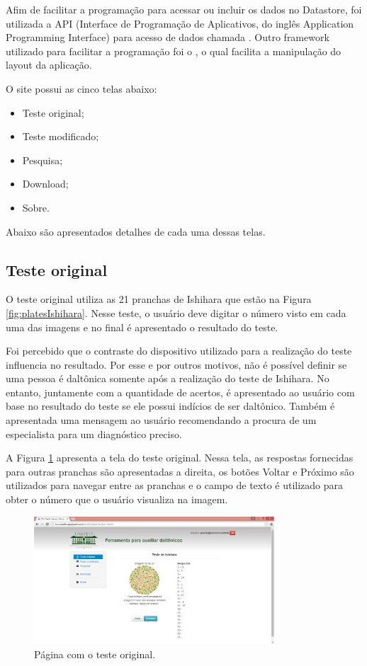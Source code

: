 \documentclass[	12pt, Times, openright, twoside, a4paper, english, brazil]{abntex2}
\begin{document}
Afim de facilitar a programação para acessar ou incluir os dados no Datastore, foi utilizada a API (Interface de Programação de Aplicativos, do inglês Application Programming Interface) para acesso de dados chamada . Outro framework utilizado para facilitar a programação foi o , o qual facilita a manipulação do layout da aplicação.

O site possui as cinco telas abaixo:

\begin{itemize}
\item Teste original;
\item Teste modificado;
\item Pesquisa;
\item Download;
\item Sobre.
\end{itemize}

Abaixo são apresentados detalhes de cada uma dessas telas.

\subsection{Teste original}
O teste original utiliza as 21 pranchas de Ishihara que estão na Figura \ref{fig:platesIshihara}. Nesse teste, o usuário deve digitar o número visto em cada uma das imagens e no final é apresentado o resultado do teste. 

Foi percebido que o contraste do dispositivo utilizado para a realização do teste influencia no resultado. Por esse e por outros motivos, não é possível definir se uma pessoa é daltônica somente após a realização do teste de Ishihara. No entanto, juntamente com a quantidade de acertos, é apresentado ao usuário com base no resultado do teste se ele possui indícios de ser daltônico. Também é apresentada uma mensagem ao usuário recomendando a procura de um especialista para um diagnóstico preciso.

A Figura \ref{fig:telaTesteOriginal} apresenta a tela do teste original. Nessa tela, as respostas fornecidas para outras pranchas são apresentadas a direita, os botões Voltar e Próximo são utilizados para navegar entre as pranchas e o campo de texto é utilizado para obter o número que o usuário visualiza na imagem.

\begin{figure}[!htb]
\centering \includegraphics[width=0.8\textwidth]{telaTesteOriginal.jpg}
\caption{Página com o teste original.} \label{fig:telaTesteOriginal}
\end{figure}
\end{document}
